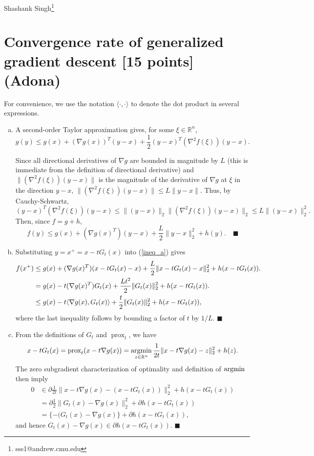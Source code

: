 \documentclass[11pt]{article}
\newcommand{\qed}{\quad \ensuremath{\blacksquare}}
\newcommand{\R}{\mathbb{R}}
\newcommand{\prox}{\operatorname{prox}}
\newcommand{\argmin}{\operatornamewithlimits{argmin}}   %
\begin{document}
Shashank Singh\footnote{sss1@andrew.cmu.edu}
\setcounter{section}{3}
\section{Convergence rate of generalized gradient descent [15 points] (Adona)}
For convenience, we use the notation $\langle \cdot, \cdot \rangle$ to denote
the dot product in several expressions.
\begin{enumerate}[(a)]
\item A second-order Taylor approximation gives, for some $\xi \in \R^n$,
\[g(y) \leq g(x)    + (\nabla g(x))^T(y - x)
                    + \frac12(y - x)^T(\nabla^2f(\xi))(y - x).\]

Since all directional derivatives of $\nabla g$ are bounded in magnitude by $L$
(this is immediate from the definition of directional derivative) and
$\|(\nabla^2f(\xi))(y - x)\|$ is the magnitude of the derivative of $\nabla g$
at $\xi$ in the direction $y - x$,
$\|(\nabla^2f(\xi))(y - x)\| \leq L\|y - x\|$.
Thus, by Cauchy-Schwartz,
\[(y - x)^T(\nabla^2f(\xi))(y - x)
    \leq \|(y - x)\|_2\|(\nabla^2f(\xi))(y - x)\|_2
    \leq L\|(y - x)\|_2^2
.\]
Then, since $f = g + h$,
\begin{equation}
\label{ineq_a}
f(y)
    \leq g(x) + (\nabla g(x)^T) (y - x) + \frac{L}{2} \|y - x\|_2^2
    + h(y). \qed
\end{equation}
 
\item Substituting $y = x^+ = x - tG_t(x)$ into (\ref{ineq_a}) gives
\begin{align}
\label{ineq_b}
\notag
f(x^+)
 &  \leq g(x) + (\nabla g(x)^T) (x - tG_t(x) - x)
    + \frac{L}{2} \|x - tG_t(x) - x\|_2^2 + h(x - tG_t(x)). \\
\notag
 &  = g(x) - t(\nabla g(x)^T) G_t(x)
    + \frac{Lt^2}{2} \|G_t(x)\|_2^2 + h(x - tG_t(x)). \\
 &  \leq g(x) - t\langle \nabla g(x), G_t(x) \rangle
    + \frac{t}{2} \|G_t(x)\|_2^2 + h(x - tG_t(x)),
\end{align}
where the last inequality follows by bounding a factor of $t$ by $1/L$. \qed
 
\item From the definitions of $G_t$ and $\prox_t$, we have
\[x - tG_t(x)
    = \prox_t(x - t\nabla g(x))
    = \argmin_{z \in \R^n} \frac{1}{2t} \| x - t\nabla g(x) - z\|_2^2 + h(z).
\]
The zero subgradient characterization of optimality and definition of
$\argmin$ then imply
\begin{align*}
0
 &  \in \partial \frac{1}{2t} \| x - t\nabla g(x) - (x - tG_t(x))\|_2^2
                                                        + h(x - tG_t(x))    \\
 &  =   \partial \frac{1}{2} \| G_t(x) - \nabla g(x)\|_2^2
                                                + \partial h(x - tG_t(x))   \\
 &  =   \{-(G_t(x) - \nabla g(x)\} + \partial h(x - tG_t(x)),
\end{align*}
and hence $G_t(x) - \nabla g(x) \in \partial h(x - tG_t(x))$. \qed
 

\end{enumerate}
\end{document}
